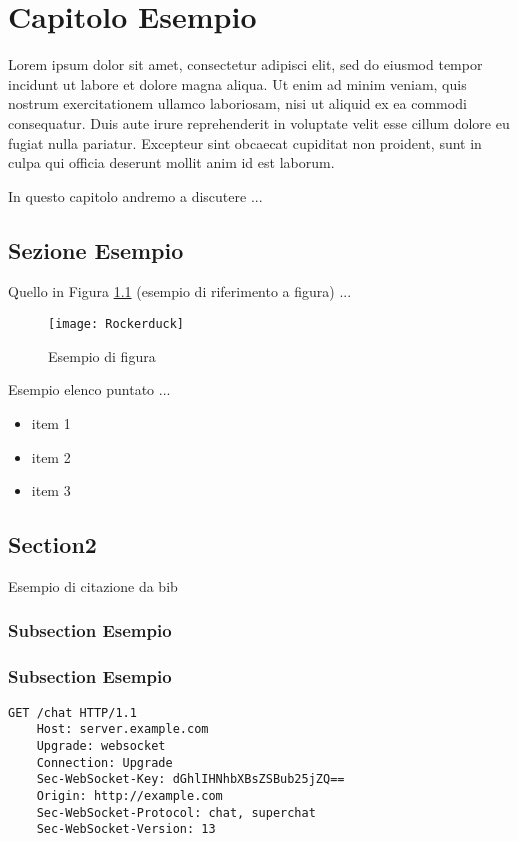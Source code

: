 \chapter{Capitolo Esempio}
\label{chap:Capitolo2}

Lorem ipsum dolor sit amet, consectetur adipisci elit, sed do eiusmod tempor incidunt ut labore et dolore magna aliqua. Ut enim ad minim veniam, quis nostrum exercitationem ullamco laboriosam, nisi ut aliquid ex ea commodi consequatur. Duis aute irure reprehenderit in voluptate velit esse cillum dolore eu fugiat nulla pariatur. Excepteur sint obcaecat cupiditat non proident, sunt in culpa qui officia deserunt mollit anim id est laborum.

In questo capitolo andremo a discutere ...
  
\section{Sezione Esempio}
\label{sec:real-time}
Quello in Figura \ref{fig:rocker}  (esempio di riferimento a figura) ...

\begin{figure}[htpb!]
  \centering
  \texttt{[image: Rockerduck]}
  \caption{Esempio di figura}
  \label{fig:rocker}
\end{figure}

Esempio elenco puntato ...
\begin{itemize}
	\item item 1
	\item item 2
	\item item 3
\end{itemize}


\section{Section2}


Esempio di citazione da bib \cite{MP} 

\subsection{Subsection Esempio}
\label{sec:handshake}

\subsection{Subsection Esempio}
\label{sec:handshake}

\begin{lstlisting}[caption={Esempio di listing}, style=javaScriptCode]
	GET /chat HTTP/1.1
	Host: server.example.com
	Upgrade: websocket
	Connection: Upgrade
	Sec-WebSocket-Key: dGhlIHNhbXBsZSBub25jZQ==
	Origin: http://example.com
	Sec-WebSocket-Protocol: chat, superchat
	Sec-WebSocket-Version: 13
\end{lstlisting} 


